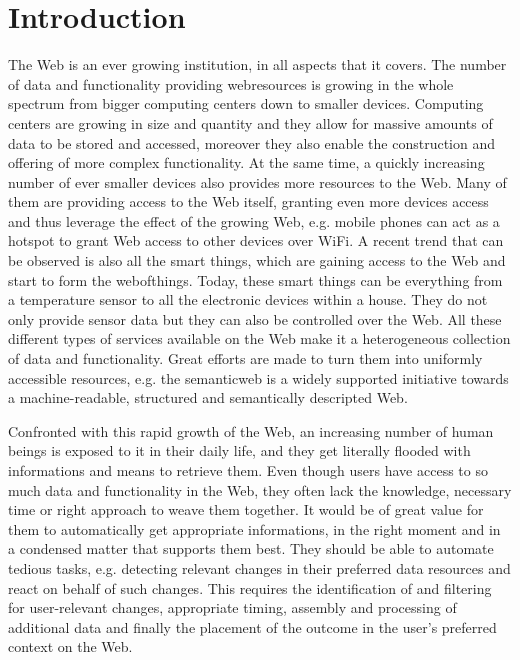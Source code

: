 
\chapter{Introduction}

The Web is an ever growing institution, in all aspects that it covers.
The number of data and functionality providing \textrm{\glspl{webresource}} is growing in the whole spectrum from bigger computing centers down to smaller devices.
Computing centers are growing in size and quantity and they allow for massive amounts of data to be stored and accessed, moreover they also enable the construction and offering of more complex functionality.
At the same time, a quickly increasing number of ever smaller devices also provides more resources to the Web.
Many of them are providing access to the Web itself, granting even more devices access and thus leverage the effect of the growing Web, e.g. mobile phones can act as a hotspot to grant Web access to other devices over \textrm{WiFi}.
A recent trend that can be observed is also all the smart things, which are gaining access to the Web and start to form the \textrm{\gls{webofthings}}.
Today, these smart things can be everything from a temperature sensor to all the electronic devices within a house.
They do not only provide sensor data but they can also be controlled over the Web.
All these different types of services available on the Web make it a heterogeneous collection of data and functionality.
Great efforts are made to turn them into uniformly accessible resources, e.g. the \textrm{\gls{semanticweb}} is a widely supported initiative towards a machine-readable, structured and semantically descripted Web.

Confronted with this rapid growth of the Web, an increasing number of human beings is exposed to it in their daily life, and they get literally flooded with informations and means to retrieve them.
Even though users have access to so much data and functionality in the Web, they often lack the knowledge, necessary time or right approach to weave them together.
It would be of great value for them to automatically get appropriate informations, in the right moment and in a condensed matter that supports them best.
They should be able to automate tedious tasks, e.g. detecting relevant changes in their preferred data resources and react on behalf of such changes.
This requires the identification of and filtering for user-relevant changes, appropriate timing, assembly and processing of additional data and finally the placement of the outcome in the user's preferred context on the Web.

